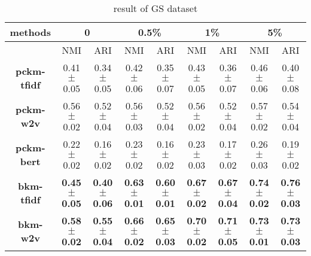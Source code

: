 \begin{table}[htbp]
\caption{result of GS dataset}
\begin{center}
\begin{tabular}{c |c|c |c|c |c|c |c|c}
\hline
\textbf{methods}
	&\multicolumn{2}{|c}{0}
	&\multicolumn{2}{|c}{0.5\%}
	&\multicolumn{2}{|c}{1\%}
	&\multicolumn{2}{|c}{5\%}
	\\\hline
& NMI&ARI & NMI&ARI & NMI&ARI & NMI&ARI \\\hline
\textbf{pckm-tfidf}
	&0.41$\pm$0.05		&0.34$\pm$0.05
	&0.42$\pm$0.06		&0.35$\pm$0.07
	&0.43$\pm$0.05		&0.36$\pm$0.07
	&0.46$\pm$0.06		&0.40$\pm$0.08
	\\\hline
\textbf{pckm-w2v}
	&0.56$\pm$0.02		&0.52$\pm$0.04
	&0.56$\pm$0.03		&0.52$\pm$0.04
	&0.56$\pm$0.02		&0.52$\pm$0.04
	&0.57$\pm$0.02		&0.54$\pm$0.04
	\\\hline
\textbf{pckm-bert}
	&0.22$\pm$0.02		&0.16$\pm$0.02
	&0.23$\pm$0.02		&0.16$\pm$0.02
	&0.23$\pm$0.03		&0.17$\pm$0.02
	&0.26$\pm$0.03		&0.19$\pm$0.02
	\\\hline
\textbf{bkm-tfidf}
	&\textbf{0.45$\pm$0.05}		&\textbf{0.40$\pm$0.06}
	&\textbf{0.63$\pm$0.01}		&\textbf{0.60$\pm$0.01}
	&\textbf{0.67$\pm$0.02}		&\textbf{0.67$\pm$0.04}
	&\textbf{0.74$\pm$0.02}		&\textbf{0.76$\pm$0.03}
	\\\hline
\textbf{bkm-w2v}
	&\textbf{0.58$\pm$0.02}		&\textbf{0.55$\pm$0.04}
	&\textbf{0.66$\pm$0.02}		&\textbf{0.65$\pm$0.03}
	&\textbf{0.70$\pm$0.02}		&\textbf{0.71$\pm$0.05}
	&\textbf{0.73$\pm$0.01}		&\textbf{0.73$\pm$0.03}
	\\\hline
\end{tabular}
\label{tb:res-gs}
\end{center}
\end{table}





